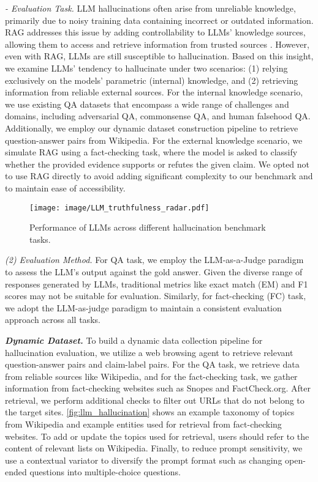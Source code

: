 \noindent \textit{- Evaluation Task.} LLM hallucinations often arise from unreliable knowledge, primarily due to noisy training data containing incorrect or outdated information. RAG addresses this issue by adding controllability to LLMs' knowledge sources, allowing them to access and retrieve information from trusted sources \cite{li2024dalk}. However, even with RAG, LLMs are still susceptible to hallucination. Based on this insight, we examine LLMs' tendency to hallucinate under two scenarios: (1) relying exclusively on the models' parametric (internal) knowledge, and (2) retrieving information from reliable external sources. For the internal knowledge scenario, we use existing QA datasets that encompass a wide range of challenges and domains, including adversarial QA, commonsense QA, and human falsehood QA. Additionally, we employ our dynamic dataset construction pipeline to retrieve question-answer pairs from Wikipedia. For the external knowledge scenario, we simulate RAG using a fact-checking task, where the model is asked to classify whether the provided evidence supports or refutes the given claim. We opted not to use RAG directly to avoid adding significant complexity to our benchmark and to maintain ease of accessibility.

\begin{wrapfigure}[18]{r}{0.36\textwidth}
    \vspace{-10pt}
  \centering
  \texttt{[image: image/LLM\_truthfulness\_radar.pdf]}
   \vspace{-15pt}
  \caption{Performance of LLMs across different hallucination benchmark tasks.}
  \label{fig:llm_truthfulness_radar}
  \vspace{-10pt}
\end{wrapfigure}


\noindent \textit{(2) Evaluation Method.} For QA task, we employ the LLM-as-a-Judge paradigm to assess the LLM's output against the gold answer. Given the diverse range of responses generated by LLMs, traditional metrics like exact match (EM) and F1 scores may not be suitable for evaluation. Similarly, for fact-checking (FC) task, we adopt the LLM-as-judge paradigm to maintain a consistent evaluation approach across all tasks.


\textbf{\textit{Dynamic Dataset.}}
To build a dynamic data collection pipeline for hallucination evaluation, we utilize a web browsing agent to retrieve relevant question-answer pairs and claim-label pairs. For the QA task, we retrieve data from reliable sources like Wikipedia, and for the fact-checking task, we gather information from fact-checking websites such as Snopes and FactCheck.org. After retrieval, we perform additional checks to filter out URLs that do not belong to the target sites. \autoref{fig:llm_hallucination} shows an example taxonomy of topics from Wikipedia and example entities used for retrieval from fact-checking websites. To add or update the topics used for retrieval, users should refer to the content of relevant lists on Wikipedia. Finally, to reduce prompt sensitivity, we use a contextual variator to diversify the prompt format such as changing open-ended questions into multiple-choice questions.

